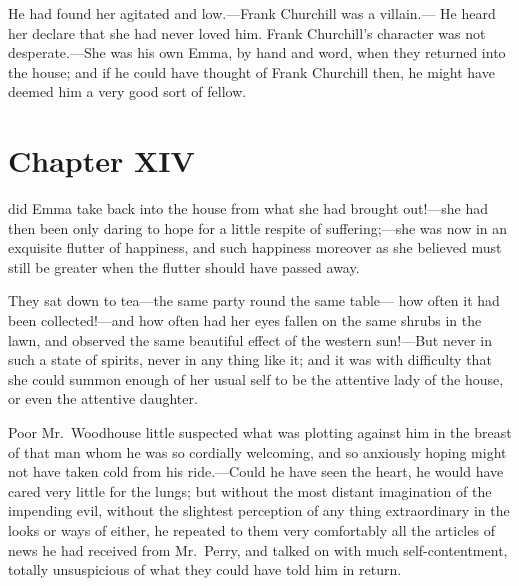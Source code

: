 He had found her agitated and low.---Frank Churchill was a villain.---%
He heard her declare that she had never loved him.  Frank Churchill's
character was not desperate.---She was his own Emma, by hand and word,
when they returned into the house; and if he could have thought
of Frank Churchill then, he might have deemed him a very good sort
of fellow.



\chapter{Chapter XIV}


 did Emma take back into the house
from what she had brought out!---she had then been only daring to hope
for a little respite of suffering;---she was now in an exquisite
flutter of happiness, and such happiness moreover as she believed
must still be greater when the flutter should have passed away.

They sat down to tea---the same party round the same table---%
how often it had been collected!---and how often had her eyes fallen
on the same shrubs in the lawn, and observed the same beautiful
effect of the western sun!---But never in such a state of spirits,
never in any thing like it; and it was with difficulty that she could
summon enough of her usual self to be the attentive lady of the house,
or even the attentive daughter.

Poor Mr.\ Woodhouse little suspected what was plotting against him
in the breast of that man whom he was so cordially welcoming, and so
anxiously hoping might not have taken cold from his ride.---Could he
have seen the heart, he would have cared very little for the lungs;
but without the most distant imagination of the impending evil,
without the slightest perception of any thing extraordinary in
the looks or ways of either, he repeated to them very comfortably
all the articles of news he had received from Mr.\ Perry, and talked
on with much self-contentment, totally unsuspicious of what they
could have told him in return.

